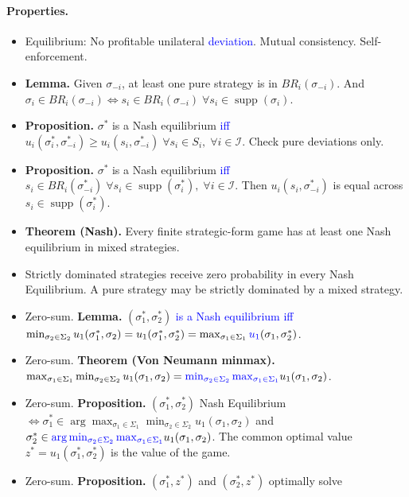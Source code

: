 \documentclass{article}
\newcommand{\new}[1]{\textcolor{blue}{#1}}
\newcommand{\res}[1]{\textbf{#1.}}
\begin{document}
\paragraph{Properties.}
\begin{itemize}
    \item Equilibrium: No profitable unilateral \new{deviation}. Mutual consistency. Self-enforcement.
    \item \res{Lemma} Given $\sigma_{-i}$, at least one pure strategy is in $BR_i(\sigma_{-i})$. And $\sigma_i\in BR_i(\sigma_{-i}) \iff s_{i}\in BR_i(\sigma_{-i})\;\forall s_i\in\operatorname{supp}(\sigma_i)$.
    \item \res{Proposition} $\sigma^*$ is a Nash equilibrium \new{iff} $u_i(\sigma^*_i, \sigma^*_{-i}) \geq u_i(s_i,\sigma^*_{-i})\;\forall s_i\in S_i,\;\forall i\in\mathcal I$. Check pure deviations only.
    \item \res{Proposition} $\sigma^*$ is a Nash equilibrium \new{iff} $s_i\in BR_i(\sigma^*_{-i})\;\forall s_i\in\operatorname{supp}(\sigma^*_i),\;\forall i\in\mathcal I$. Then $u_i(s_i,\sigma^*_{-i})$ is equal across $s_i\in\operatorname{supp}(\sigma_i^*)$.
    \item \res{Theorem (Nash)} Every finite strategic-form game has at least one Nash equilibrium in mixed strategies.
    \item Strictly dominated strategies receive zero probability in every Nash Equilibrium. A pure strategy may be strictly dominated by a mixed strategy.
    \item Zero-sum. \res{Lemma} $(\sigma^*_1,\sigma^*_2)$ \new{is a Nash equilibrium iff} $\min_{\sigma_2\in\Sigma_2}u_1(\sigma^*_1,\sigma_2) = u_1(\sigma^*_1,\sigma^*_2) = \max_{\sigma_1\in\Sigma_1}\new{u_1}(\sigma_1,\sigma^*_2)$.
    \item Zero-sum. \res{Theorem (Von Neumann minmax)} $\max_{\sigma_1\in\Sigma_1}\min_{\sigma_2\in\Sigma_2}u_1(\sigma_1,\sigma_2) = \new{\min_{\sigma_2\in\Sigma_2}\max_{\sigma_1\in\Sigma_1}}u_1(\sigma_1,\sigma_2)$.
    \item Zero-sum. \res{Proposition} $(\sigma^*_1,\sigma^*_2)$ Nash Equilibrium $\iff \sigma^*_1\in\arg\max_{\sigma_1\in\Sigma_1}\min_{\sigma_2\in\Sigma_2}u_1(\sigma_1,\sigma_2)$ and $\sigma^*_2\in\new{\arg\min_{\sigma_2\in\Sigma_2}\max_{\sigma_1\in\Sigma_1}}u_1(\sigma_1,\sigma_2)$. The common optimal value $z^*=u_1(\sigma_1^*,\sigma_2^*)$ is the value of the game.
    \item Zero-sum. \res{Proposition} $(\sigma_1^*,z^*)$ and $(\sigma_2^*,z^*)$ optimally solve

\end{itemize}
\end{document}

